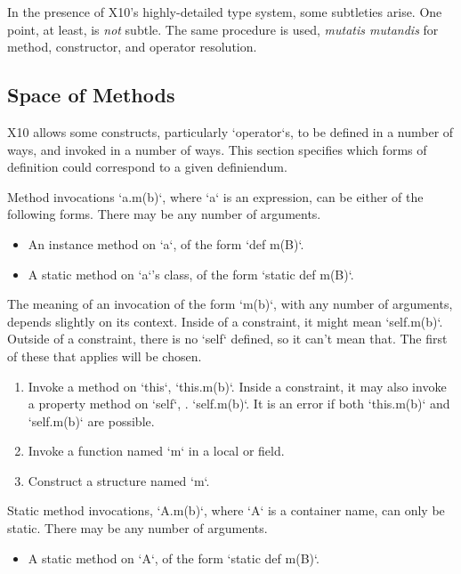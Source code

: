 \noindent
In the presence of X10's highly-detailed type system, some subtleties arise. 
One point, at least, is {\em not} subtle. The same procedure is used, {\em
mutatis mutandis} for method, constructor, and operator resolution.  



\subsection{Space of Methods}

X10 allows some constructs, particularly \xcd`operator`s, to be defined in a
number of ways, and invoked in a number of ways. This section specifies which
forms of definition could correspond to a given definiendum.

Method invocations \xcd`a.m(b)`, where \xcd`a` is an expression, can be either
of the following forms.  There may be any number of arguments.
\begin{itemize}
\item An instance method on \xcd`a`, of the form \xcd`def m(B)`.
\item A static method on \xcd`a`'s class, of the form \xcd`static def m(B)`.
\end{itemize}

The meaning of an invocation of the form \xcd`m(b)`, with any number of
arguments, depends slightly on its context.  Inside of a constraint, it might
mean \xcd`self.m(b)`.  Outside of a constraint, there is no \xcd`self`
defined, so it can't mean that.  The first of these that applies will be
chosen. 
\begin{enumerate}
\item Invoke a method on \xcd`this`, \viz{} \xcd`this.m(b)`.  Inside a
      constraint, it may also invoke a property method on \xcd`self`, \viz.
      \xcd`self.m(b)`.  It is an error if both \xcd`this.m(b)` and
      \xcd`self.m(b)` are possible.
\item Invoke a function named \xcd`m` in a local or field.
\item Construct a structure named \xcd`m`.
\end{enumerate}

Static method invocations, \xcd`A.m(b)`, where \xcd`A` is a container name,
can only be static.  There may be any number of arguments.
\begin{itemize}
\item A static method on \xcd`A`, of the form \xcd`static def m(B)`.
\end{itemize}


